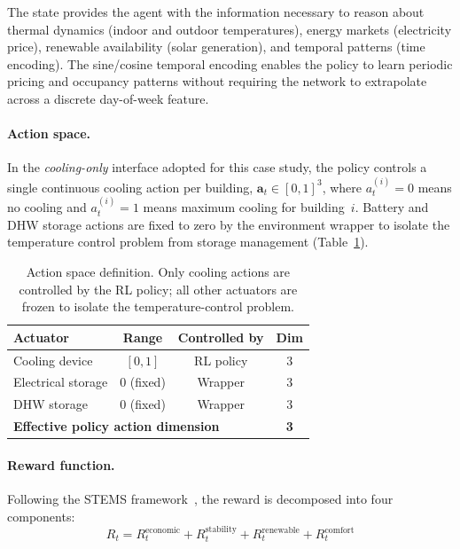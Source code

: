 The state provides the agent with the information necessary to reason about
thermal dynamics (indoor and outdoor temperatures), energy markets (electricity
price), renewable availability (solar generation), and temporal patterns
(time encoding).  The sine/cosine temporal encoding enables the policy to learn
periodic pricing and occupancy patterns without requiring the network to
extrapolate across a discrete day-of-week feature.

\paragraph{Action space.}
In the \emph{cooling-only} interface adopted for this case study, the policy
controls a single continuous cooling action per building,
$\mathbf{a}_t \in [0,1]^3$, where $a_t^{(i)} = 0$ means no cooling and
$a_t^{(i)} = 1$ means maximum cooling for building~$i$.  Battery and DHW
storage actions are fixed to zero by the environment wrapper to isolate the
temperature control problem from storage management (Table~\ref{tab:action-space}).

\begin{table}[htbp]
\centering
\caption{Action space definition.  Only cooling actions are controlled by the
  RL policy; all other actuators are frozen to isolate the temperature-control
  problem.}
\label{tab:action-space}
\begin{tabular}{lccc}
\toprule
\textbf{Actuator} & \textbf{Range} & \textbf{Controlled by} & \textbf{Dim} \\
\midrule
Cooling device & $[0, 1]$ & RL policy & $3$ \\
Electrical storage & $0$ (fixed) & Wrapper & $3$ \\
DHW storage & $0$ (fixed) & Wrapper & $3$ \\
\midrule
\multicolumn{3}{l}{\textbf{Effective policy action dimension}} & \textbf{3} \\
\bottomrule
\end{tabular}
\end{table}

\paragraph{Reward function.}
Following the STEMS framework~\cite{zhang2025stems}, the reward is decomposed
into four components:
\begin{equation}
  R_t = R_t^{\text{economic}} + R_t^{\text{stability}} +
        R_t^{\text{renewable}} + R_t^{\text{comfort}}
  \label{eq:reward-decomposition}
\end{equation}

